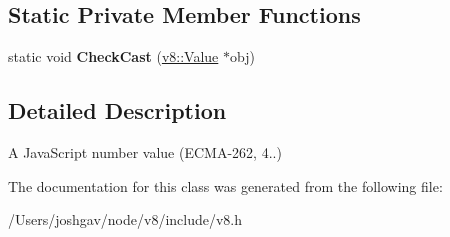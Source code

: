 \subsection*{Static Private Member Functions}
\begin{DoxyCompactItemize}
\item 
static void {\bfseries Check\+Cast} (\hyperlink{classv8_1_1_value}{v8\+::\+Value} $\ast$obj)\hypertarget{classv8_1_1_number_a722d1cad74dd79ab1653fecc8c3dafa7}{}\label{classv8_1_1_number_a722d1cad74dd79ab1653fecc8c3dafa7}

\end{DoxyCompactItemize}


\subsection{Detailed Description}
A Java\+Script number value (E\+C\+M\+A-\/262, 4..) 

The documentation for this class was generated from the following file\+:\begin{DoxyCompactItemize}
\item 
/\+Users/joshgav/node/v8/include/v8.\+h\end{DoxyCompactItemize}
